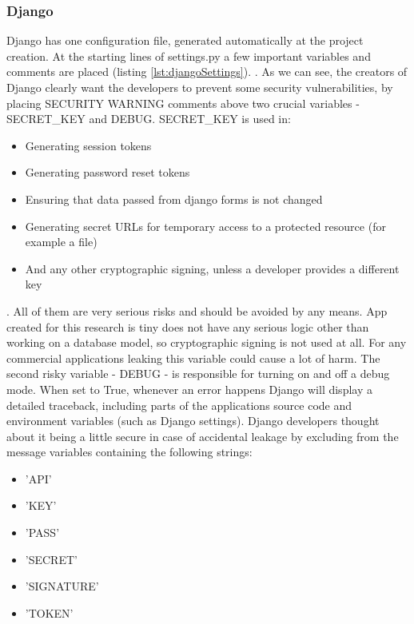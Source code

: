 \subsubsection{Django}
Django has one configuration file, generated automatically at the project creation. At the starting lines of settings.py a few important variables and comments are placed (listing \ref{lst:djangoSettings}).
.
As we can see, the creators of Django clearly want the developers to prevent some security vulnerabilities, by placing SECURITY WARNING comments above two crucial variables - SECRET\_KEY and DEBUG.
SECRET\_KEY is used in:
\begin{itemize}
    \item Generating session tokens
    \item Generating password reset tokens
    \item Ensuring that data passed from django forms is not changed
    \item Generating secret URLs for temporary access to a protected resource (for example a file)
    \item And any other cryptographic signing, unless a developer provides a different key
\end{itemize}.
All of them are very serious risks and should be avoided by any means. App created for this research is tiny does not have any serious logic other than working on a database model, so cryptographic signing is not used at all. For any commercial applications leaking this variable could cause a lot of harm.
The second risky variable - DEBUG - is responsible for turning on and off a debug mode. When set to True, whenever an error happens Django will display a detailed traceback, including parts of the applications source code and environment variables (such as Django settings).
Django developers thought about it being a little secure in case of accidental leakage by excluding from the message variables containing the following strings:
\begin{itemize}
    \item 'API'
    \item 'KEY'
    \item 'PASS'
    \item 'SECRET'
    \item 'SIGNATURE'
    \item 'TOKEN'
\end{itemize}


